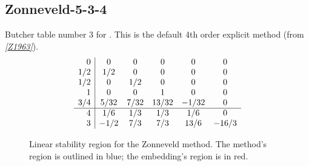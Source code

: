 \documentclass[letterpaper,10pt,english]{sphinxmanual}
\begin{document}
\subsection{Zonneveld-5-3-4}
\label{Butcher:butcher-zonneveld}\label{Butcher:zonneveld-5-3-4}
Butcher table number 3
for {\hyperref[c_interface/User_callable:c.ARKodeSetERKTableNum]{\emph{}}}.  This is
the default 4th order explicit method (from \label{Butcher:id3}{\hyperref[References:z1963]{\emph{{[}Z1963{]}}}}).
\begin{gather}
\begin{split}\begin{array}{r|ccccc}
    0 & 0 & 0 & 0 & 0 & 0 \\
  1/2 & 1/2 & 0 & 0 & 0 & 0 \\
  1/2 & 0 & 1/2 & 0 & 0 & 0 \\
    1 & 0 & 0 & 1 & 0 & 0 \\
  3/4 & 5/32 & 7/32 & 13/32 & -1/32 & 0 \\
  \hline
  4 & 1/6 & 1/3 & 1/3 & 1/6 & 0 \\
  3 & -1/2 & 7/3 & 7/3 & 13/6 & -16/3
\end{array}\end{split}\notag
\end{gather}\begin{figure}[htbp]
\centering
\capstart

\caption{Linear stability region for the Zonneveld method.  The method's
region is outlined in blue; the embedding's region is in red.}\end{figure}
\end{document}
